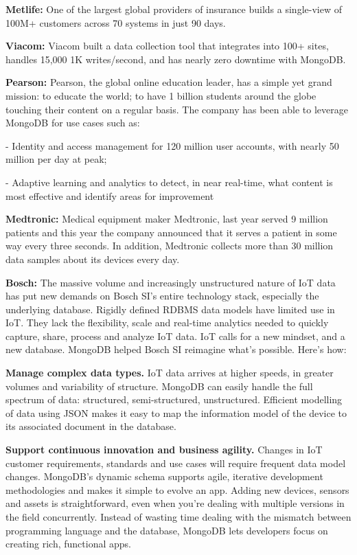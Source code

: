 \documentclass[9pt,twocolumn,twoside]{../../styles/osajnl}
\begin{document}
{\bfseries Metlife:} One of the largest global providers of insurance
builds a single-view of 100M+ customers across 70 systems in just 90
days.

{\bfseries Viacom:} Viacom built a data collection tool that
integrates into 100+ sites, handles 15,000 1K writes/second, and has
nearly zero downtime with MongoDB.

{\bfseries Pearson:} Pearson, the global online education leader, has
a simple yet grand mission: to educate the world; to have 1 billion
students around the globe touching their content on a regular
basis. The company has been able to leverage MongoDB for use cases
such as:

- Identity and access management for 120 million user accounts, with
nearly 50 million per day at peak;

- Adaptive learning and analytics to detect, in near real-time, what
content is most effective and identify areas for improvement

{\bfseries Medtronic:} Medical equipment maker Medtronic, last year
served 9 million patients and this year the company announced that it
serves a patient in some way every three seconds. In addition,
Medtronic collects more than 30 million data samples about its devices
every day.

{\bfseries Bosch:} The massive volume and increasingly unstructured
nature of IoT data has put new demands on Bosch SI's entire technology
stack, especially the underlying database. Rigidly defined RDBMS data
models have limited use in IoT. They lack the flexibility, scale and
real-time analytics needed to quickly capture, share, process and
analyze IoT data.  IoT calls for a new mindset, and a new
database. MongoDB helped Bosch SI reimagine what’s possible. Here’s
how:

{\bfseries Manage complex data types.} IoT data arrives at higher
speeds, in greater volumes and variability of structure. MongoDB can
easily handle the full spectrum of data: structured, semi-structured,
unstructured. Efficient modelling of data using JSON makes it easy to
map the information model of the device to its associated document in
the database.

{\bfseries Support continuous innovation and business agility.}
Changes in IoT customer requirements, standards and use cases will
require frequent data model changes. MongoDB’s dynamic schema supports
agile, iterative development methodologies and makes it simple to
evolve an app. Adding new devices, sensors and assets is
straightforward, even when you’re dealing with multiple versions in
the field concurrently. Instead of wasting time dealing with the
mismatch between programming language and the database, MongoDB lets
developers focus on creating rich, functional apps.
\end{document}

